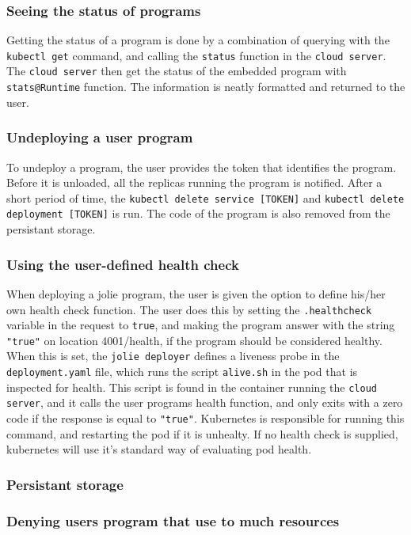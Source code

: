 \documentclass[Report.tex]{subfiles}
\begin{document}
\subsubsection{Seeing the status of programs}
Getting the status of a program is done by a combination of querying with the {\tt kubectl get} command, and calling the {\tt status} function in the {\tt cloud server}. The {\tt cloud server} then get the status of the embedded program with {\tt stats@Runtime} function. The information is neatly formatted and returned to the user.
\subsubsection{Undeploying a user program}
To undeploy a program, the user provides the token that identifies the program. Before it is unloaded, all the replicas running the program is notified. After a short period of time, the {\tt kubectl delete service [TOKEN]} and {\tt kubectl delete deployment [TOKEN]} is run. The code of the program is also removed from the persistant storage.
\subsubsection{Using the user-defined health check}
When deploying a jolie program, the user is given the option to define his/her own health check function. The user does this by setting the {\tt .healthcheck} variable in the request to {\tt true}, and making the program answer with the string {\tt "true"} on location 4001/health, if the program should be considered healthy. When this is set, the {\tt jolie deployer} defines a liveness probe in the {\tt deployment.yaml} file, which runs the script {\tt alive.sh} in the pod that is inspected for health. This script is found in the container running the {\tt cloud server}, and it calls the user programs health function, and only exits with a zero code if the response is equal to {\tt "true"}. Kubernetes is responsible for running this command, and restarting the pod if it is unhealty. If no health check is supplied, kubernetes will use it's standard way of evaluating pod health.

\subsubsection{Persistant storage}
\subsubsection{Denying users program that use to much resources}
\end{document}
